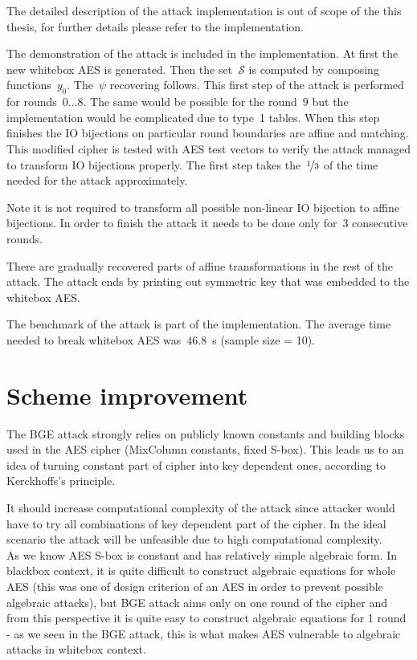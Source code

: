 \documentclass[11pt,oneside,final]{fithesis2}
\begin{document}
    The detailed description of the attack implementation is out of scope of the this thesis, for further details please refer to the implementation.

    The demonstration of the attack is included in the implementation. At first the new whitebox AES is generated. Then the set~$\mathcal{S}$ is computed
    by composing functions~$y_0$. The~$\psi$ recovering follows. This first step of the attack is performed for rounds~$0\dots8$. The same would be possible for 
    the round~$9$ but the implementation would be complicated due to type~1 tables. When this step finishes the IO bijections on particular round boundaries
    are affine and matching. This modified cipher is tested with AES test vectors to verify the attack managed to transform IO bijections properly. 
    The first step takes the~$\nicefrac{1}{3}$ of the time needed for the attack approximately.
    
    Note it is not required to transform all possible non-linear IO bijection to affine bijections. In order to finish the attack it needs to be done only for~3 consecutive rounds.
    
    There are gradually recovered parts of affine transformations in the rest of the attack. The attack ends by printing out symmetric key that was embedded to the whitebox AES.
    
    The benchmark of the attack is part of the implementation. The average time needed to break whitebox AES was~$46.8$~s (sample size = 10).
    
    \chapter{Scheme improvement}
    The BGE attack \citep{Billet:2004:CWB:2080787.2080809} strongly relies on publicly known constants and building blocks used in the AES cipher (MixColumn constants, fixed S-box). 
    This leads us to an idea of turning constant part of cipher into key dependent ones, according to Kerckhoffs's principle. 

    It should increase computational complexity of the attack since attacker would have to try
    all combinations of key dependent part of the cipher. In the ideal scenario the attack will be unfeasible due to high computational complexity. \\
    
    As we know AES S-box is constant and has relatively simple algebraic form. In blackbox context, it is quite difficult to construct algebraic equations for whole AES (this was 
    one of design criterion of an AES in order to prevent possible algebraic attacks), but BGE attack aims only on one round of the cipher and from this perspective it is 
    quite easy to construct algebraic equations for 1 round - as we seen in the BGE attack, this is what makes AES vulnerable to algebraic attacks in whitebox context.\\
    
\end{document}
